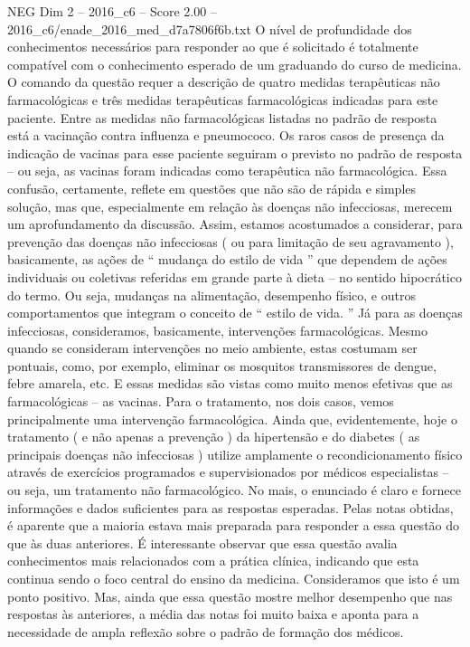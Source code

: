 \begin{textsample}{NEG Dim 2 – 2016\_c6 – Score 2.00 – 2016\_c6/enade\_2016\_med\_d7a7806f6b.txt}
O nível de profundidade dos conhecimentos necessários para responder ao que é solicitado é totalmente compatível com o conhecimento esperado de um graduando do curso de medicina.
O comando da questão requer a descrição de quatro medidas terapêuticas não farmacológicas e três medidas terapêuticas farmacológicas indicadas para este paciente.
Entre as medidas não farmacológicas listadas no padrão de resposta está a vacinação contra influenza e pneumococo.
Os raros casos de presença da indicação de vacinas para esse paciente seguiram o previsto no padrão de resposta – ou seja, as vacinas foram indicadas como terapêutica não farmacológica.
Essa confusão, certamente, reflete em questões que não são de rápida e simples solução, mas que, especialmente em relação às doenças não infecciosas, merecem um aprofundamento da discussão.
Assim, estamos acostumados a considerar, para prevenção das doenças não infecciosas ( ou para limitação de seu agravamento ), basicamente, as ações de “ mudança do estilo de vida ” que dependem de ações individuais ou coletivas referidas em grande parte à dieta – no sentido hipocrático do termo.
Ou seja, mudanças na alimentação, desempenho físico, e outros comportamentos que integram o conceito de “ estilo de vida. ” Já para as doenças infecciosas, consideramos, basicamente, intervenções farmacológicas.
Mesmo quando se consideram intervenções no meio ambiente, estas costumam ser pontuais, como, por exemplo, eliminar os mosquitos transmissores de dengue, febre amarela, etc.
E essas medidas são vistas como muito menos efetivas que as farmacológicas – as vacinas.
Para o tratamento, nos dois casos, vemos principalmente uma intervenção farmacológica.
Ainda que, evidentemente, hoje o tratamento ( e não apenas a prevenção ) da hipertensão e do diabetes ( as principais doenças não infecciosas ) utilize amplamente o recondicionamento físico através de exercícios programados e supervisionados por médicos especialistas – ou seja, um tratamento não farmacológico.
No mais, o enunciado é claro e fornece informações e dados suficientes para as respostas esperadas.
Pelas notas obtidas, é aparente que a maioria estava mais preparada para responder a essa questão do que às duas anteriores.
É interessante observar que essa questão avalia conhecimentos mais relacionados com a prática clínica, indicando que esta continua sendo o foco central do ensino da medicina.
Consideramos que isto é um ponto positivo.
Mas, ainda que essa questão mostre melhor desempenho que nas respostas às anteriores, a média das notas foi muito baixa e aponta para a necessidade de ampla reflexão sobre o padrão de formação dos médicos.

\end{textsample}
